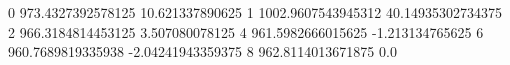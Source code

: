 0 973.4327392578125 10.621337890625
1 1002.9607543945312 40.14935302734375
2 966.3184814453125 3.507080078125
4 961.5982666015625 -1.213134765625
6 960.7689819335938 -2.04241943359375
8 962.8114013671875 0.0
